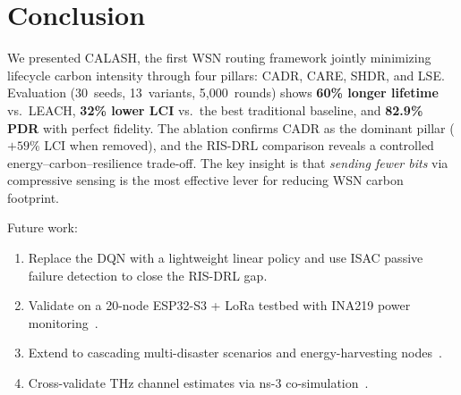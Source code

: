 \section{Conclusion}
\label{art2:sec:conclusion}

We presented CALASH, the first WSN routing framework jointly minimizing lifecycle carbon intensity through four pillars: CADR, CARE, SHDR, and LSE.
Evaluation (30~seeds, 13~variants, 5{,}000~rounds) shows \textbf{60\% longer lifetime} vs.\ LEACH, \textbf{32\% lower LCI} vs.\ the best traditional baseline, and \textbf{82.9\% PDR} with perfect fidelity.
The ablation confirms CADR as the dominant pillar ($+59\%$ LCI when removed), and the RIS-DRL comparison reveals a controlled energy--carbon--resilience trade-off.
The key insight is that \emph{sending fewer bits} via compressive sensing is the most effective lever for reducing WSN carbon footprint.

Future work:

\begin{enumerate}
    \item Replace the DQN with a lightweight linear policy and use ISAC passive failure detection to close the RIS-DRL gap.
    \item Validate on a 20-node ESP32-S3 + LoRa testbed with INA219 power monitoring~\cite{uk_carbon_api}.
    \item Extend to cascading multi-disaster scenarios and energy-harvesting nodes~\cite{huang2013energy}.
    \item Cross-validate THz channel estimates via ns-3 co-simulation~\cite{ns3_thz}.
\end{enumerate}

\FloatBarrier

